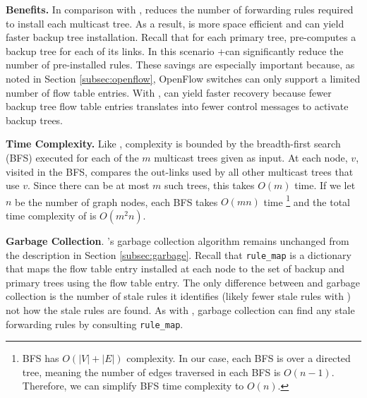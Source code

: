 {\bf Benefits.}
In comparison with \bases, \merge reduces the number of forwarding rules required to install each multicast tree.  As a result,
\merge is more space efficient and can yield faster backup tree installation.
Recall that for each primary tree, \mdr pre-computes a backup tree for each of its links.  In this scenario \pres+\merge can significantly reduce the number of pre-installed rules.
These savings are especially important because, as noted in Section \ref{subsec:openflow}, OpenFlow switches can only support a limited number of flow table entries.
With \posts, \merge can yield faster recovery because fewer backup tree flow table entries translates into fewer control messages to activate backup trees.

{\bf Time Complexity.}
Like \bases, \merge complexity is bounded by the breadth-first search (BFS) executed for each of the $m$ multicast trees given as input.  At each node, $v$, visited in the BFS, \merge
compares the out-links used by all other multicast trees that use $v$.  Since there can be at most $m$ such trees, this takes $O(m)$ time.  If we let $n$ be the number of graph nodes,
each BFS takes $O(mn)$ time \footnote{BFS has $O(|V|+|E|)$ complexity. In our case, each BFS is over a directed tree, meaning the number of edges traversed in each BFS is $O(n-1)$.  
Therefore, we can simplify BFS time complexity to $O(n)$.}
and the total time complexity of \merge is $O(m^2n)$.


{\bf Garbage Collection}.
\mdrs's garbage collection algorithm remains unchanged from the description in Section \ref{subsec:garbage}.  
Recall that {\tt rule\_map} is a dictionary that maps the flow table entry installed at each node to the
set of backup and primary trees using the flow table entry. The only difference between \base and \merge garbage collection is the number of stale rules it identifies (likely fewer
stale rules with \merges) not how the stale rules are found.  
As with \bases, \merge garbage collection can find any stale forwarding rules by consulting {\tt rule\_map}.


